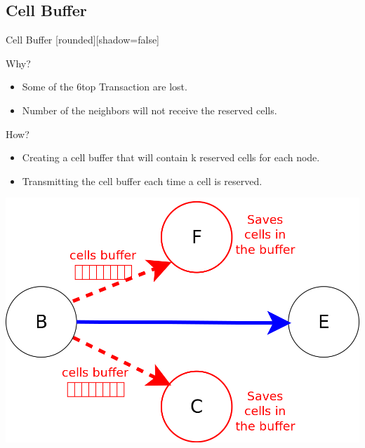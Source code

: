 \subsection{Cell Buffer}
\begin{withoutheadline}
\begin{frame}{Cell Buffer}
[rounded][shadow=false]

\begin{block}{Why?}
\begin{itemize}

\item Some of the 6top Transaction are lost. 
\item Number of the neighbors will not receive the reserved cells. 

\end{itemize}
\end{block}

\begin{block}{How?}
\begin{itemize}


\item Creating a cell buffer that will contain k reserved cells for each node. 
\item<2-> Transmitting the cell buffer each time a cell is reserved.
\end{itemize}
\end{block}
\centering
\includegraphics[width=.4\linewidth]{figures/buff.png}

\end{frame}
\end{withoutheadline}